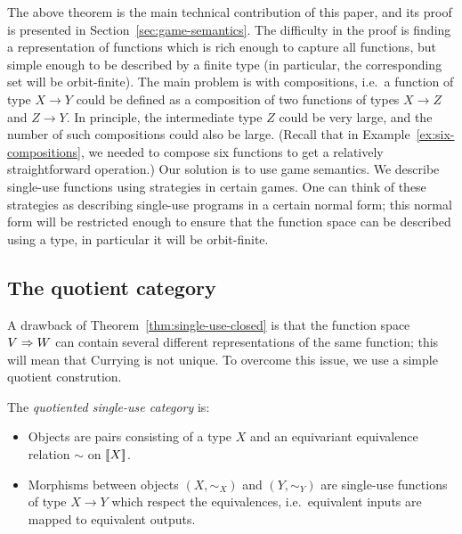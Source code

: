The above theorem is the main technical contribution of this paper, and its proof is presented in Section~\ref{sec:game-semantics}. The difficulty in the proof is finding a representation of functions which is rich enough to capture all functions, but simple enough to be described by a finite type (in particular, the corresponding set will be orbit-finite). The main problem is with compositions, i.e.~a function of type $X \to Y$ could be defined as a composition of two functions of types $X \to Z$ and $Z \to Y$. In principle, the intermediate type $Z$ could  be very large, and the number of such compositions could also be large. (Recall that in Example~\ref{ex:six-compositions}, we needed to compose six functions to get a relatively straightforward operation.) Our solution is to use game semantics. We describe single-use functions using strategies in certain games. One can think of these strategies as describing single-use programs in a certain normal form; this normal form will be restricted enough to ensure that the function space can be described using a type, in particular it will be orbit-finite. 








\subsection{The quotient category}
\label{sec:quotient-category}
A drawback of Theorem~\ref{thm:single-use-closed} is that the function space $V \Rightarrow W$ can contain several different representations of the same function; this will mean that Currying is not unique. To overcome this issue, we use a simple quotient constrution. 




\begin{definition}
    The \emph{quotiented single-use category} is: 
    \begin{itemize}
    \item Objects are pairs consisting of a type $X$ and an equivariant  equivalence relation $\sim$ on $[{\kern-0.4ex}[X]{\kern-0.4ex}]$.
    \item Morphisms between objects $(X,\sim_X)$ and $(Y,\sim_Y)$ are single-use functions of type $X \to Y$  which respect the equivalences, i.e.~equivalent inputs are mapped to equivalent outputs.
    \end{itemize}
\end{definition}

